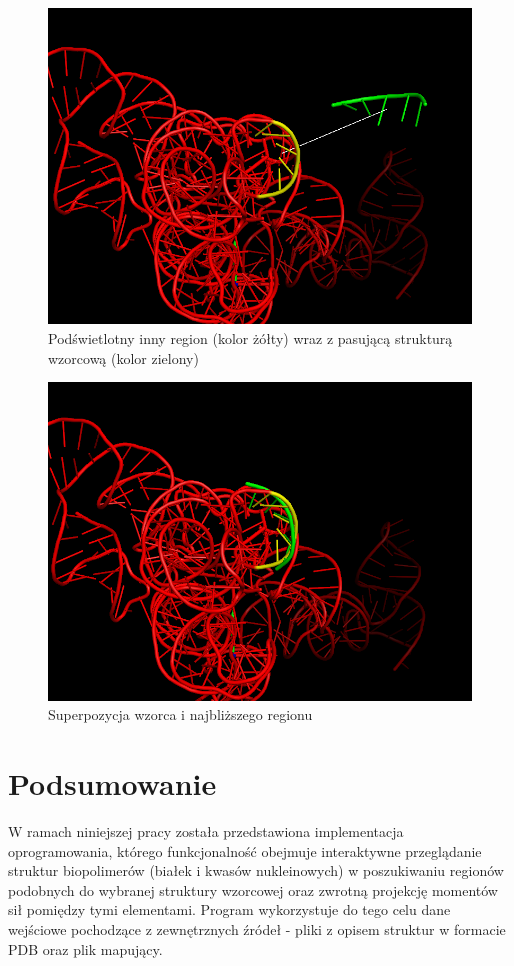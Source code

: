 \documentclass[licencjacka]{pracamgr}
\begin{document}
\begin{figure}[H]
\centering
\includegraphics[scale=0.45,center]{ex2}
\caption{Podświetlotny inny region (kolor żółty) wraz z pasującą strukturą wzorcową (kolor zielony)}
\end{figure}

\begin{figure}[H]
\centering
\includegraphics[scale=0.45,center]{ex2-aligned}
\caption{Superpozycja wzorca i najbliższego regionu}
\end{figure}

\chapter{Podsumowanie}
W ramach niniejszej pracy została przedstawiona implementacja oprogramowania, którego funkcjonalność obejmuje interaktywne przeglądanie struktur biopolimerów (białek i kwasów nukleinowych) w poszukiwaniu regionów podobnych do wybranej struktury wzorcowej oraz zwrotną projekcję momentów sił pomiędzy tymi elementami. Program wykorzystuje do tego celu dane wejściowe pochodzące z zewnętrznych źródeł - pliki z opisem struktur w formacie PDB oraz plik mapujący.
\end{document}
